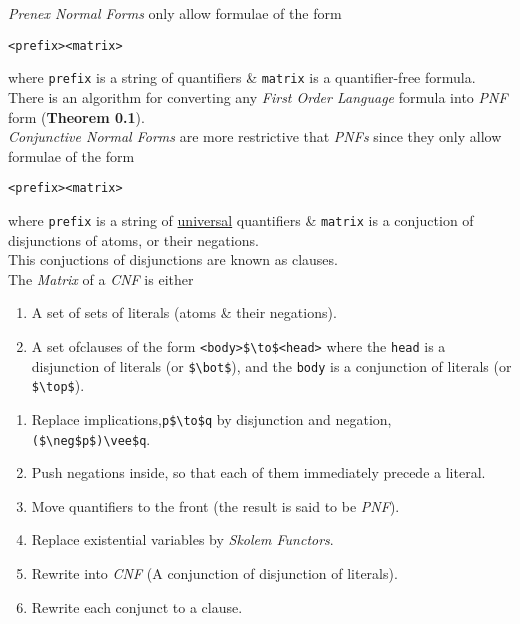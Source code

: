 \documentclass[11pt,a4paper]{article}
\begin{document}
\textit{Prenex Normal Forms} only allow formulae of the form
\begin{center}
\lstinline!<prefix><matrix>!
\end{center}
where \lstinline!prefix! is a string of quantifiers \& \lstinline!matrix! is a quantifier-free formula.\\
\nb There is an algorithm for converting any \textit{First Order Language} formula into \textit{PNF} form (\textbf{Theorem 0.1}).\\

\textit{Conjunctive Normal Forms} are more restrictive that \textit{PNFs} since they only allow formulae of the form
\begin{center}
\lstinline!<prefix><matrix>!
\end{center}
where \lstinline!prefix! is a string of \underline{universal} quantifiers \& \lstinline!matrix! is a conjuction of disjunctions of atoms, or their negations.\\
This conjuctions of disjunctions are known as clauses.\\

The \textit{Matrix} of a \textit{CNF} is either
\begin{enumerate}
	\item A set of sets of literals (\ie atoms \& their negations).
	\item A set ofclauses of the form \lstinline!<body>$\to$<head>! where the \lstinline!head! is a disjunction of literals (or \lstinline!$\bot$!), and the \lstinline!body! is a conjunction of literals (or \lstinline!$\top$!).
\end{enumerate}

\begin{enumerate}
	\item Replace implications,\lstinline!p$\to$q! by disjunction and negation, \lstinline!($\neg$p$)\vee$q!.
	\item Push negations inside, so that each of them immediately precede a literal.
	\item Move quantifiers to the front (the result is said to be \textit{PNF}).
	\item Replace existential variables by \textit{Skolem Functors}. %
	\item Rewrite into \textit{CNF} (\ie A conjunction of disjunction of literals).
	\item Rewrite each conjunct to a clause.
\end{enumerate}
\end{document}
